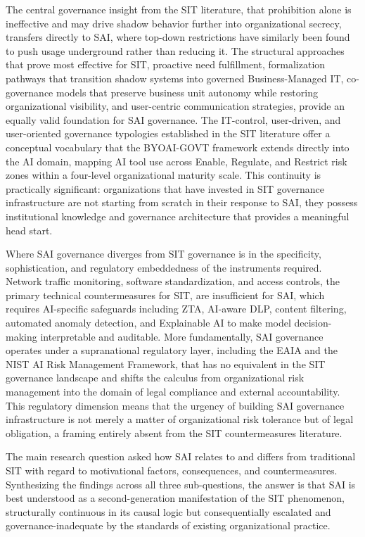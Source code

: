 \documentclass[12pt,oneside]{article}
\begin{document}
The central governance insight from the \ac{SIT} literature, that prohibition alone is ineffective and may drive shadow behavior further into organizational secrecy, transfers directly to \ac{SAI}, where top-down restrictions have similarly been found to push usage underground rather than reducing it. The structural approaches that prove most effective for \ac{SIT}, proactive need fulfillment, formalization pathways that transition shadow systems into governed Business-Managed \ac{IT}, co-governance models that preserve business unit autonomy while restoring organizational visibility, and user-centric communication strategies, provide an equally valid foundation for \ac{SAI} governance. The \ac{IT}-control, user-driven, and user-oriented governance typologies established in the \ac{SIT} literature offer a conceptual vocabulary that the BYOAI-GOVT framework extends directly into the \ac{AI} domain, mapping \ac{AI} tool use across Enable, Regulate, and Restrict risk zones within a four-level organizational maturity scale. This continuity is practically significant: organizations that have invested in \ac{SIT} governance infrastructure are not starting from scratch in their response to \ac{SAI}, they possess institutional knowledge and governance architecture that provides a meaningful head start.

Where \ac{SAI} governance diverges from \ac{SIT} governance is in the specificity, sophistication, and regulatory embeddedness of the instruments required. Network traffic monitoring, software standardization, and access controls, the primary technical countermeasures for \ac{SIT}, are insufficient for \ac{SAI}, which requires \ac{AI}-specific safeguards including \ac{ZTA}, \ac{AI}-aware \ac{DLP}, content filtering, automated anomaly detection, and Explainable \ac{AI} to make model decision-making interpretable and auditable. More fundamentally, \ac{SAI} governance operates under a supranational regulatory layer, including the \ac{EAIA} and the \ac{NIST} \ac{AI} Risk Management Framework, that has no equivalent in the \ac{SIT} governance landscape and shifts the calculus from organizational risk management into the domain of legal compliance and external accountability. This regulatory dimension means that the urgency of building \ac{SAI} governance infrastructure is not merely a matter of organizational risk tolerance but of legal obligation, a framing entirely absent from the \ac{SIT} countermeasures literature.

The main research question asked how \ac{SAI} relates to and differs from traditional \ac{SIT} with regard to motivational factors, consequences, and countermeasures. Synthesizing the findings across all three sub-questions, the answer is that \ac{SAI} is best understood as a second-generation manifestation of the \ac{SIT} phenomenon, structurally continuous in its causal logic but consequentially escalated and governance-inadequate by the standards of existing organizational practice.
\end{document}
